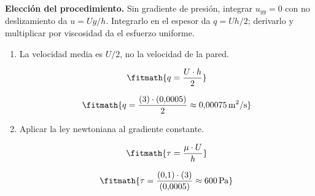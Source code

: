 \noindent\textbf{Elección del procedimiento.} Sin gradiente de presión, integrar $u_{yy}=0$ con no deslizamiento da $u=Uy/h$. Integrarlo en el espesor da $q=Uh/2$; derivarlo y multiplicar por viscosidad da el esfuerzo uniforme.

\begin{enumerate}

\item La velocidad media es $U/2$, no la velocidad de la pared.

\[\fitmath{q=\frac{U\cdot h}{2}}\]

\[\fitmath{q=\frac{(3)\cdot (0{,}0005)}{2}\approx 0{,}00075\,\mathrm{m^{2}/s}}\]

\item Aplicar la ley newtoniana al gradiente constante.

\[\fitmath{\tau=\frac{\mu\cdot U}{h}}\]

\[\fitmath{\tau=\frac{(0{,}1)\cdot (3)}{(0{,}0005)}\approx 600\,\mathrm{Pa}}\]

\end{enumerate}
